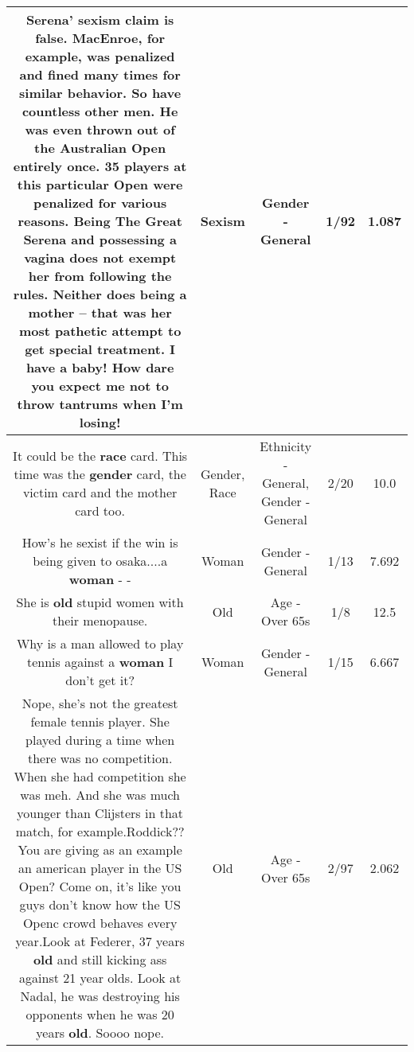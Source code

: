 \documentclass[11pt]{article}
\newlength\mylength
\begin{document}
\begin{center}
\begin{longtable}{|C{.65\mylength}|C{.30\mylength}|C{.12\mylength}|C{.12\mylength}|C{.12\mylength}|}
  \small Serena' \textbf{sexism} claim is false. MacEnroe, for example, was penalized and fined many times for similar behavior.  So have countless other men. He was even thrown out of the Australian Open entirely once. 35 players at this particular Open were penalized for various reasons. Being The Great Serena and possessing a vagina does not exempt her from following the rules. Neither does being a mother -- that was her most pathetic attempt to get special treatment.  I have a baby!  How dare you expect me not to throw tantrums when I'm losing!\normalsize   & Sexism & Gender - General & 1/92 & 1.087 \\  \hline
  \small It could be the \textbf{race} card. This time was the \textbf{gender} card, the victim card and the mother card too.\normalsize   & Gender, Race & Ethnicity - General, Gender - General & 2/20 & 10.0 \\  \hline
  \small How's he sexist if the win is being given to osaka....a \textbf{woman} - -\normalsize   & Woman & Gender - General & 1/13 & 7.692 \\  \hline
  \small She is \textbf{old} stupid women with their menopause.\normalsize   & Old & Age - Over 65s & 1/8 & 12.5 \\  \hline
  \small Why is a man allowed to play tennis against a \textbf{woman} I don't get it?\normalsize   & Woman & Gender - General & 1/15 & 6.667 \\  \hline
  \small Nope, she's not the greatest female tennis player. She played during a time when there was no competition. When she had competition she was meh. And she was much younger than Clijsters in that match, for example.Roddick?? You are giving as an example an american player in the US Open? Come on, it's like you guys don't know how the US Openc crowd behaves every year.Look at Federer, 37 years \textbf{old} and still kicking ass against 21 year olds. Look at Nadal, he was destroying his opponents when he was 20 years \textbf{old}. Soooo nope.\normalsize   & Old & Age - Over 65s & 2/97 & 2.062 \\  \hline

\end{longtable}
\end{center}
\end{document}
